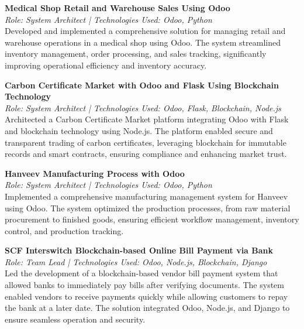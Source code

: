 \documentclass[a4paper,10pt]{article}
\begin{document}
\vspace{3mm}

\textbf{Medical Shop Retail and Warehouse Sales Using Odoo} \\
\textit{Role: System Architect | Technologies Used: Odoo, Python} \\
Developed and implemented a comprehensive solution for managing retail and warehouse operations in a medical shop using Odoo. The system streamlined inventory management, order processing, and sales tracking, significantly improving operational efficiency and inventory accuracy.

\vspace{3mm}

\textbf{Carbon Certificate Market with Odoo and Flask Using Blockchain Technology} \\
\textit{Role: System Architect | Technologies Used: Odoo, Flask, Blockchain, Node.js} \\
Architected a Carbon Certificate Market platform integrating Odoo with Flask and blockchain technology using Node.js. The platform enabled secure and transparent trading of carbon certificates, leveraging blockchain for immutable records and smart contracts, ensuring compliance and enhancing market trust.

\vspace{3mm}

\textbf{Hanveev Manufacturing Process with Odoo} \\
\textit{Role: System Architect | Technologies Used: Odoo, Python} \\
Implemented a comprehensive manufacturing management system for Hanveev using Odoo. The system optimized the production processes, from raw material procurement to finished goods, ensuring efficient workflow management, inventory control, and production tracking.

\vspace{3mm}

\textbf{SCF Interswitch Blockchain-based Online Bill Payment via Bank} \\
\textit{Role: Team Lead | Technologies Used: Odoo, Node.js, Blockchain, Django} \\
Led the development of a blockchain-based vendor bill payment system that allowed banks to immediately pay bills after verifying documents. The system enabled vendors to receive payments quickly while allowing customers to repay the bank at a later date. The solution integrated Odoo, Node.js, and Django to ensure seamless operation and security.
\end{document}
